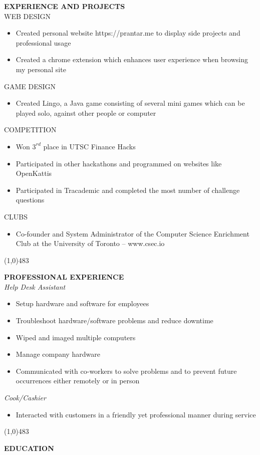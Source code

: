 \documentclass[10pt,oneside]{article}
\begin{document}
        
        \large{\textbf{EXPERIENCE AND PROJECTS}}\\
        \large{WEB DESIGN}\\
        \begin{itemize}
            \item Created personal website https://prantar.me to display side projects and professional usage
            \item Created a chrome extension which enhances user experience when browsing my personal site
        \end{itemize}
        \large{GAME DESIGN}\\
        \begin{itemize}
            \item Created Lingo, a Java game consisting of several mini games which can be played solo, against other people or computer
        \end{itemize}
        \large{COMPETITION}
        \begin{itemize}
            \item Won \(3^{rd}\) place in UTSC Finance Hacks
            \item Participated in other hackathons and programmed on websites like OpenKattis
            \item Participated in Tracademic and completed the most number of challenge questions
        \end{itemize}
        \large{CLUBS}
        \begin{itemize}
            \item Co-founder and System Administrator of the Computer Science Enrichment Club at the University of Toronto – www.csec.io
        \end{itemize}
        \line(1,0){483}
        
        
        \large{\textbf{PROFESSIONAL EXPERIENCE}}\\
        \makebox[\textwidth][c]{}%
        \textit{Help Desk Assistant}
        \begin{itemize}
            \item Setup hardware and software for employees
            \item Troubleshoot hardware/software problems and reduce downtime
            \item Wiped and imaged multiple computers
            \item Manage company hardware
            \item Communicated with co-workers to solve problems and to prevent future occurrences either remotely or in person
        \end{itemize}
        \makebox[\textwidth][c]{}%
        \textit{Cook/Cashier}
        \begin{itemize}
            \item Interacted with customers in a friendly yet professional manner during service
        \end{itemize}
        \line(1,0){483}
        
        
        \large{\textbf{EDUCATION}}\\
        \makebox[\textwidth][c]{}%
    
\end{document}
